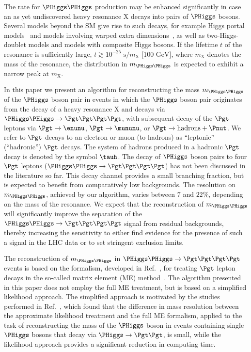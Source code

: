 The rate for $\PHiggs\PHiggs$ production may be enhanced significantly in case an as yet undiscovered heavy resonance $\textrm{X}$ decays into pairs of $\PHiggs$ bosons.
Several models beyond the SM give rise to such decays, 
for example Higgs portal models~\cite{Englert:2011yb,No:2013wsa} and models involving warped extra dimensions~\cite{Randall:1999ee},
as well as two-Higgs-doublet models and models with composite Higgs bosons.
If the lifetime $t$ of the resonance is sufficiently large, $t \gtrsim 10^{-25}\textrm{~s}/m_{\textrm{X}}\textrm{~[100~GeV]}$, 
where $m_{\textrm{X}}$ denotes the mass of the resonance, 
the distribution in $m_{\PHiggs\PHiggs}$ is expected to exhibit a narrow peak at $m_{\textrm{X}}$.

In this paper we present an algorithm for reconstructing the mass $m_{\PHiggs\PHiggs}$ of the $\PHiggs$ boson pair 
in events in which the $\PHiggs$ boson pair originates from the decay of a heavy resonance $\textrm{X}$ 
and decays via $\PHiggs\PHiggs \to \Pgt\Pgt\Pgt\Pgt$,
with subsequent decay of the $\Pgt$ leptons via $\Pgt \to \enunu$, $\Pgt \to \mununu$, or $\Pgt \to \textrm{hadrons} + \Pnut$.
We refer to $\Pgt$ decays to an electron or muon (to hadrons) as ``leptonic'' (``hadronic'') $\Pgt$ decays.
The system of hadrons produced in a hadronic $\Pgt$ decay is denoted by the symbol $\tauh$.
The decay of $\PHiggs$ boson pairs to four $\Pgt$ leptons ($\PHiggs\PHiggs \to \Pgt\Pgt\Pgt\Pgt$) has not been discussed in the literature so far.
This decay channel provides a small branching fraction, but is expected to benefit from comparatively low backgrounds.
The resolution on $m_{\PHiggs\PHiggs}$, achieved by our algorithm, varies between $7$ and $22\%$,
depending on the mass of the resonance.
We expect that the reconstruction of $m_{\PHiggs\PHiggs}$ will significantly improve 
the separation of the $\PHiggs\PHiggs \to \Pgt\Pgt\Pgt\Pgt$ signal from residual backgrounds,
thereby increasing the sensitivity to either find evidence for the presence of such a signal in the LHC data or to set stringent exclusion limits.

The reconstruction of $m_{\PHiggs\PHiggs}$ in $\PHiggs\PHiggs \to \Pgt\Pgt\Pgt\Pgt$ events is based on the formalism,
developed in Ref.~\cite{SVfitMEM}, for treating $\Pgt$ lepton decays in the so-called matrix element (ME) method~\cite{Kondo:1988yd,Kondo:1991dw}.
The algorithm presented in this paper does not employ the full ME treatment,
but is based on a simplified likelihood approach.
The simplified approach is motivated by the studies performed in Ref.~\cite{SVfitMEM}, 
which found that the difference in mass resolution between the approximate likelihood treatment and the full ME formalism,
applied to the task of reconstructing the mass of the $\PHiggs$ boson in events containing single $\PHiggs$ bosons that decay via $\PHiggs \to \Pgt\Pgt$,
is small, while the likelihood approach provides a significant reduction in computing time.

